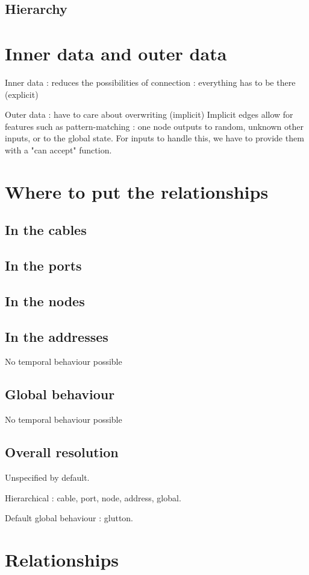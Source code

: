 \documentclass[a4paper,twocolumns]{article}
\begin{document}
	\subsection{Hierarchy}
	
	\section{Inner data and outer data}
	Inner data : reduces the possibilities of connection : everything has to be there (explicit)
	
	Outer data : have to care about overwriting (implicit)
    Implicit edges allow for features such as pattern-matching : one node outputs to random, unknown other inputs, or to 
    the global state.
    For inputs to handle this, we have to provide them with a "can accept" function.
	
    
    \section{Where to put the relationships}
    \subsection{In the cables}
    \subsection{In the ports}
    \subsection{In the nodes}
    \subsection{In the addresses}
    No temporal behaviour possible
    \subsection{Global behaviour}
    No temporal behaviour possible
    \subsection{Overall resolution}
    Unspecified by default. 
    
    Hierarchical : cable, port, node, address, global.
   
    Default global behaviour : glutton.
   
	\section{Relationships}
\end{document}
